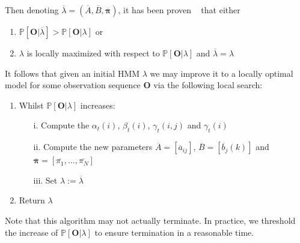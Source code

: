 Then denoting $\overline{\lambda} = (\overline{A},\overline{B},\overline{\bm{\pi}})$, it has been proven ~\citep{levinson1983introduction, baum1968growth} that either
\begin{enumerate}
\item $\mathbb{P}[\bm{O}|\overline{\lambda}] > \mathbb{P}[\bm{O}|\lambda]$ or
\item $\lambda$ is locally maximized with respect to $\mathbb{P}[\bm{O}|\lambda]$ and $\overline{\lambda} = \lambda$
\end{enumerate}
It follows that given an initial HMM $\lambda$ we may improve it to a locally optimal model for some observation sequence $\bm{O}$ via the following local search:
\begin{enumerate}
\item Whilst $\mathbb{P}[\bm{O}|\lambda]$ increases:
	\begin{enumerate}
		\item[i.] Compute the $\alpha_t(i)$, $\beta_t(i)$, $\gamma_t(i,j)$ and $\gamma_t(i)$
		\item[ii.] Compute the new parameters $\overline{A} = [\overline{a}_{ij}]$, $\overline{B} = [\overline{b}_j(k)]$ and $\overline{\bm{\pi}} = [\overline{\pi_1}, \dots, \overline{\pi_N}]$
		\item[iii.] Set $\lambda := \overline{\lambda}$
	\end{enumerate}
\item Return $\lambda$
\end{enumerate}
Note that this algorithm may not actually terminate. In practice, we threshold the increase of $\mathbb{P}[\bm{O}|\lambda]$ to ensure termination in a reasonable time. 

